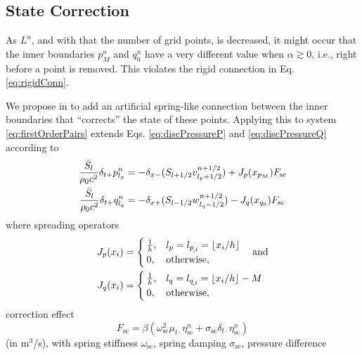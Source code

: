 \subsection{State Correction}
As $L^n$, and with that the number of grid points, is decreased, it might occur that the inner boundaries $p_M^n$ and $q_0^n$ have a very different value when $\alpha \gtrsim 0$, i.e., right before a point is removed. This violates the rigid connection in Eq. \eqref{eq:rigidConn}. 

We propose in \cite{Willemsen2021} to add an artificial spring-like connection between the inner boundaries that ``corrects'' the state of these points. Applying this to system \eqref{eq:firstOrderPairs} extends Eqs. \eqref{eq:discPressureP} and \eqref{eq:discPressureQ} according to
\begin{subequations}\label{eq:pressuresWithSC}
    \begin{align}
        \frac{\bar S_{l}}{\rho_0 c^2}\delta_{t+}p_{l_p}^n &= -\delta_{x-}(S_{{l}+1/2}v_{{l_p}+1/2}^{n+1/2}) + J_p(x_{p_M})F_\text{sc}\label{eq:pWithSC}\\
        \frac{\bar S_{l}}{\rho_0 c^2}\delta_{t+}q_{l_q}^n &= -\delta_{x+}(S_{{l}-1/2}w_{{l_q}-1/2}^{n+1/2}) - J_q(x_{q_0})F_\text{sc}\label{eq:qWithSC}
    \end{align}
\end{subequations}
where spreading operators
\begin{equation}\label{eq:spreadingOperators}
    \begin{aligned}
    J_p(x_i)& =
    \begin{cases}
        \frac{1}{h}, & {l_p} = {l_p}_{\!,i} = \lfloor x_i/h\rfloor\\
        0,& \text{otherwise},
    \end{cases}
    \quad\text{and}\\
    J_q(x_i) &=
    \begin{cases}
        \frac{1}{h}, & {l_q} = {l_q}_{\!,i} = \lfloor x_i/h \rfloor - M\\
        0,& \text{otherwise},
    \end{cases}
\end{aligned}
\end{equation}
correction effect
\begin{equation}\label{eq:scForce}
    F_\text{sc} = \beta\left(\omega_\text{sc}^2\mu_{t\cdot}\eta_\text{sc}^n+\sigma_\text{sc}\delta_{t\cdot}\eta_\text{sc}^n\right)
\end{equation}
(in m$^{3}$/s), with spring stiffness $\omega_\text{sc}$, spring damping $\sigma_\text{sc}$, pressure difference
